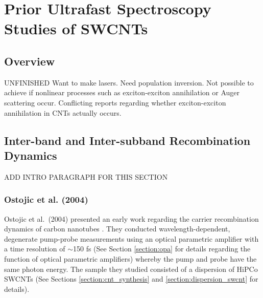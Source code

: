 \chapter{Prior Ultrafast Spectroscopy Studies of SWCNTs}

\section{Overview}

{\color{red} UNFINISHED} Want to make lasers. Need population inversion. Not possible to achieve if nonlinear processes such as exciton-exciton annihilation or Auger scattering occur. Conflicting reports regarding whether exciton-exciton annihilation in CNTs actually occurs.

\section{Inter-band and Inter-subband Recombination Dynamics}

{\color{red} ADD INTRO PARAGRAPH FOR THIS SECTION}

\subsection{Ostojic et al. (2004)}
Ostojic et al.\ (2004) presented an early work regarding the carrier recombination dynamics of carbon nanotubes \cite{ostojic2004interband}. They conducted wavelength-dependent, degenerate pump-probe measurements using an optical parametric amplifier with a time resolution of $\sim$150 fs (See Section \ref{section:opa} for details regarding the function of optical parametric amplifiers) whereby the pump and probe have the same photon energy. The sample they studied consisted of a dispersion of HiPCo SWCNTs (See Sections \ref{section:cnt_synthesis} and \ref{section:dispersion_swcnt} for details).

